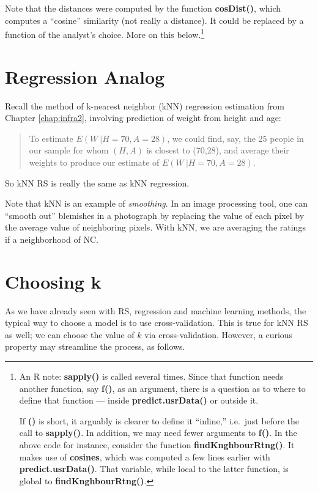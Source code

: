 Note that the distances were computed by the function
\textbf{cosDist()}, which computes a ``cosine'' similarity (not really a
distance).  It could be replaced by a function of the analyst's choice.
More on this below.\footnote{An R note: \textbf{sapply()} is called
several times.  Since that function needs another function, say
\textbf{f()}, as an argument, there is a question as to where to define
that function --- inside \textbf{predict.usrData()} or outside it.

If \textbf{()} is short, it arguably is clearer to define it
``inline,'' i.e.\ just before the call to \textbf{sapply()}.  In
addition, we may need fewer arguments to \textbf{f()}.  In the above
code for instance, consider the function \textbf{findKnghbourRtng()}.
It makes use of \textbf{cosines}, which was computed a few lines earlier
with \textbf{predict.usrData()}.  That variable, while local to the
latter function, is global to \textbf{findKnghbourRtng()}.}

\section{Regression Analog}

Recall the method of k-nearest neighbor (kNN) regression estimation from
Chapter \ref{chap:infra2}, involving prediction of weight from height
and age:

\begin{quote}
To estimate $E(W ~| H=70, A=28)$, we could find, say, the 25 people in our
sample for whom $(H,A)$ is closest to (70,28), and average their weights
to produce our estimate of $E(W ~| H=70, A=28)$.
\end{quote}

So kNN RS is really the same as kNN regression.

Note that kNN is an example of \textit{smoothing}.  In an image
processing tool, one can ``smooth out'' blemishes in a photograph by
replacing the value of each pixel by the average value of neighboring
pixels.  With kNN, we are averaging the ratings if a neighborhood of NC.

\section{Choosing k}

As we have already seen with RS, regression and machine learning methods, 
the typical way to choose a model is to use cross-validation.  This is
true for kNN RS as well; we can choose the value of $k$ via
cross-validation.  However, a curious property may streamline the
process, as follows.

